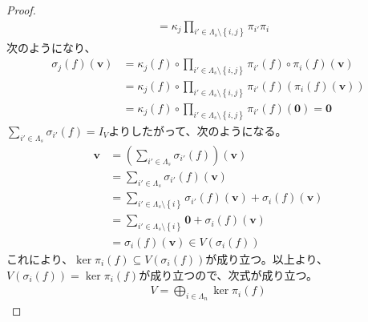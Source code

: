 \documentclass[dvipdfmx]{jsarticle}
\begin{document}
\begin{proof}
\begin{align*}
&= \kappa_{j}\prod_{i' \in \varLambda_{s} \setminus \left\{ i,j \right\}} {\pi_{i'}}\pi_{i}
\end{align*}
次のようになり、
\begin{align*}
\sigma_{j}(f)\left( \mathbf{v} \right) &= \kappa_{j}(f) \circ \prod_{i' \in \varLambda_{s} \setminus \left\{ i,j \right\}} {\pi_{i'}(f)} \circ \pi_{i}(f)\left( \mathbf{v} \right)\\
&= \kappa_{j}(f) \circ \prod_{i' \in \varLambda_{s} \setminus \left\{ i,j \right\}} {\pi_{i'}(f)}\left( \pi_{i}(f)\left( \mathbf{v} \right) \right)\\
&= \kappa_{j}(f) \circ \prod_{i' \in \varLambda_{s} \setminus \left\{ i,j \right\}} {\pi_{i'}(f)}\left( \mathbf{0} \right) = \mathbf{0}
\end{align*}
$\sum_{i' \in \varLambda_{s}} {\sigma_{i'}(f)} = I_{V}$よりしたがって、次のようになる。
\begin{align*}
\mathbf{v} &= \left( \sum_{i' \in \varLambda_{s}} {\sigma_{i'}(f)} \right)\left( \mathbf{v} \right)\\
&= \sum_{i' \in \varLambda_{s}} {\sigma_{i'}(f)\left( \mathbf{v} \right)}\\
&= \sum_{i' \in \varLambda_{s} \setminus \left\{ i \right\}} {\sigma_{i'}(f)\left( \mathbf{v} \right)} + \sigma_{i}(f)\left( \mathbf{v} \right)\\
&= \sum_{i' \in \varLambda_{s} \setminus \left\{ i \right\}} \mathbf{0} + \sigma_{i}(f)\left( \mathbf{v} \right)\\
&= \sigma_{i}(f)\left( \mathbf{v} \right) \in V\left( \sigma_{i}(f) \right)
\end{align*}
これにより、$\ker{\pi_{i}(f)} \subseteq V\left( \sigma_{i}(f) \right)$が成り立つ。以上より、$V\left( \sigma_{i}(f) \right) = \ker{\pi_{i}(f)}$が成り立つので、次式が成り立つ。
\begin{align*}
V = \bigoplus_{i \in \varLambda_{n}} {\ker{\pi_{i}(f)}}
\end{align*}
\end{proof}
\end{document}
